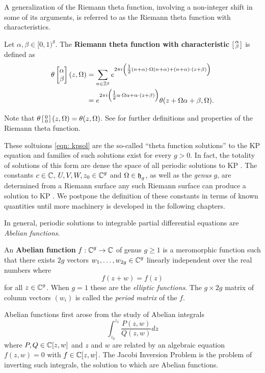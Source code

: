 A generalization of the Riemann theta function, involving a non-integer
shift in some of its arguments, is referred to as the Riemann theta
function with characteristics.

\begin{definition} \label{def: thetachar}
Let $\alpha,\beta \in [0,1)^{g}$. The {\bf Riemann theta function with
characteristic $\left[ \begin{smallmatrix} \alpha \\ \beta \end{smallmatrix} \right]$} is defined as
\begin{align*}
  \theta\begin{bmatrix}\alpha\\\beta\end{bmatrix}(z, \Omega) &=
  \sum_{n \in \mathbb{Z}^g}
  e^{2 \pi i \left( \tfrac{1}{2} (n+\alpha) \cdot \Omega (n+\alpha) +
    (n + \alpha) \cdot (z + \beta) \right) } \\
  &=
  e^{2\pi i \left( \tfrac{1}{2} \alpha \cdot \Omega \alpha +
    \alpha \cdot (z + \beta) \right)}
  \theta(z + \Omega \alpha + \beta, \Omega).
\end{align*}
\end{definition}

Note that $\theta \left[ \begin{smallmatrix} 0 \\ 0 \end{smallmatrix} \right](z,\Omega) = \theta(z,\Omega)$. See
\cite{NIST:DLMF,MumfordI07,MumfordII07} for further definitions and
properties of the Riemann theta function.

These soltuions \eqref{eqn: kpsol} are the so-called ``theta function
solutions'' to the KP equation and families of such solutions exist for
every $g > 0$. In fact, the totality of solutions of this form are dense
the space of all periodic solutions to KP \cite{Krichever93}. The
constants $c\in\operatorname{\mathbb{C}}$, $U,V,W,z_0 \in \operatorname{\mathbb{C}}^g$ and $\Omega \in \operatorname{\mathfrak{h}}_g$, as
well as the {\it genus} $g$, are determined from a Riemann surface any
such Riemann surface can produce a solution to KP \cite{Dubrovin81}. We
postpone the definition of these constants in terms of known quantities
until more machinery is developed in the following chapters.

In general, periodic solutions to integrable partial differential
equations are {\it Abelian functions}.
\begin{definition} \label{def: abelian-function}
  An {\bf Abelian function} $f : \operatorname{\mathbb{C}}^g \to \operatorname{\mathbb{C}}$ of genus $g \geq 1$ is a
  meromorphic function such that there exists $2g$ vectors
  $w_1,\ldots,w_{2g} \in \operatorname{\mathbb{C}}^g$ linearly independent over the real
  numbers where
  \[
      f(z + w) = f(z)
  \]
  for all $z \in \operatorname{\mathbb{C}}^g$. When $g=1$ these are the {\it elliptic
    functions}. The $g \times 2g$ matrix of column vectors $(w_i)$ is
  called the {\it period matrix} of the $f$.
\end{definition}
Abelian functions first arose from the study of Abelian integrals
\[
    \int_{z_0}^{z_1} \frac{P(z,w)}{Q(z,w)}dz
\]
where $P,Q \in \operatorname{\mathbb{C}}[z,w]$ and $z$ and $w$ are related by an algebraic
equation $f(z,w) = 0$ with $f \in \operatorname{\mathbb{C}}[z,w]$. The Jacobi Inversion
Problem is the problem of inverting such integrals, the solution to
which are Abelian functions.

